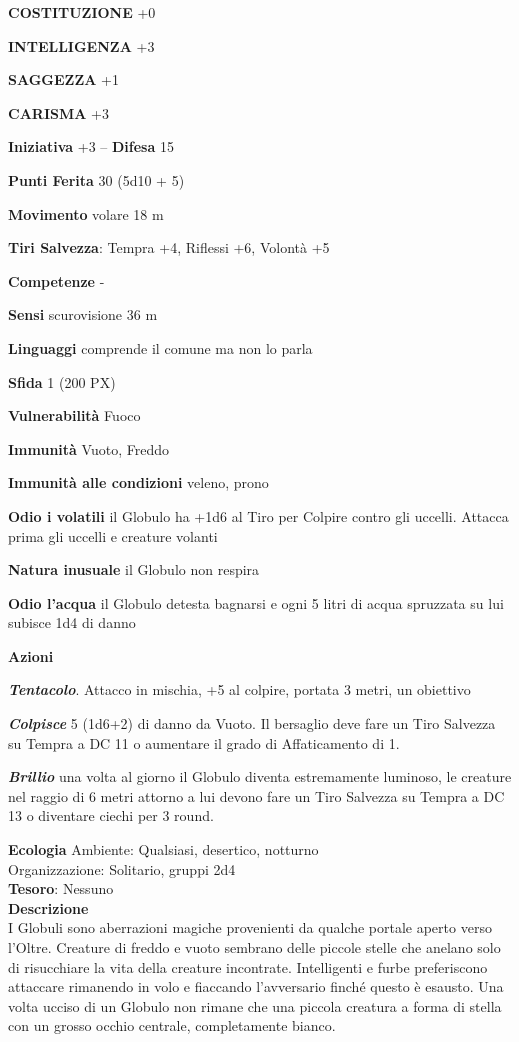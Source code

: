\begin{multicols}{2}
\textbf{COSTITUZIONE} +0

\textbf{INTELLIGENZA} +3

\textbf{SAGGEZZA} +1

\textbf{CARISMA} +3

\textbf{Iniziativa} +3 -- \textbf{Difesa} 15

\textbf{Punti Ferita} 30 (5d10 + 5)

\textbf{Movimento} volare 18 m

\textbf{Tiri Salvezza}: Tempra +4, Riflessi +6, Volontà +5

\textbf{Competenze} -

\textbf{Sensi} scurovisione 36 m

\textbf{Linguaggi} comprende il comune ma non lo parla

\textbf{Sfida} 1 (200 PX)

\textbf{Vulnerabilità} Fuoco

\textbf{Immunità} Vuoto, Freddo

\textbf{Immunità alle condizioni} veleno, prono

\textbf{Odio i volatili} il Globulo ha +1d6 al Tiro per Colpire contro gli uccelli. Attacca prima gli uccelli e creature volanti

\textbf{Natura inusuale} il Globulo non respira

\textbf{Odio l'acqua} il Globulo detesta bagnarsi e ogni 5 litri di acqua spruzzata su lui subisce 1d4 di danno

\textbf{Azioni}

\textit{\textbf{Tentacolo}}. Attacco in mischia, +5 al colpire, portata 3 metri, un obiettivo

\textit{\textbf{Colpisce}} 5 (1d6+2) di danno da Vuoto. Il bersaglio deve fare un Tiro Salvezza su Tempra a DC 11 o aumentare il grado di Affaticamento di 1.

\textbf{\textit{Brillio}} una volta al giorno il Globulo diventa estremamente luminoso, le creature nel raggio di 6 metri attorno a lui devono fare un Tiro Salvezza su Tempra a DC 13 o diventare ciechi per 3 round.

\textbf{Ecologia}
Ambiente: Qualsiasi, desertico, notturno\\
Organizzazione: Solitario, gruppi 2d4\\
\textbf{Tesoro}: Nessuno\\
\textbf{Descrizione}\\
I Globuli sono aberrazioni magiche provenienti da qualche portale aperto verso l'Oltre. Creature di freddo e vuoto sembrano delle piccole stelle che anelano solo di risucchiare la vita della creature incontrate.
Intelligenti e furbe preferiscono attaccare rimanendo in volo e fiaccando l'avversario finché questo è esausto. Una volta ucciso di un Globulo non rimane che una piccola creatura a forma di stella con un grosso occhio centrale, completamente bianco.



\end{multicols}
